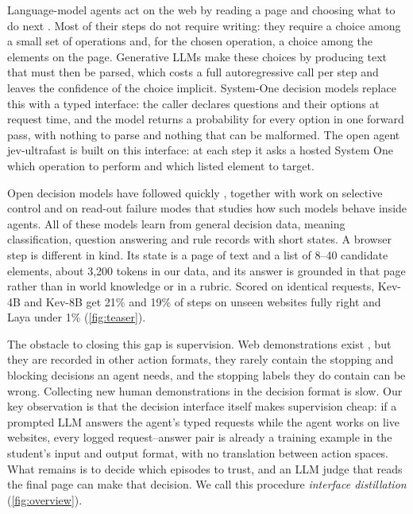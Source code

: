 \documentclass{article}
\begin{document}
Language-model agents act on the web by reading a page and choosing what to do next
\citep{yao2023react,zhou2024webarena,deng2023mind2web,he2024webvoyager}. Most of their steps do not require writing:
they require a choice among a small set of operations and, for the chosen operation, a choice among the elements on
the page. Generative LLMs make these choices by producing text that must then be parsed, which costs a full
autoregressive call per step and leaves the confidence of the choice implicit. System-One decision models
\citep{typesafe2026jev} replace this with a typed interface: the caller declares questions and their options at request
time, and the model returns a probability for every option in one forward pass, with nothing to parse and nothing that
can be malformed. The open agent jev-ultrafast \citep{jevultrafast2026} is built on this interface: at each step it asks
a hosted System One which operation to perform and which listed element to target.

Open decision models have followed quickly \citep{kev2026,laya2026,cheng2026thisthat}, together with work on
selective control \citep{wu2026reflex} and on read-out failure modes \citep{sun2026typesafe} that studies how such
models behave inside agents. All of these models learn from
general decision data, meaning classification, question answering and rule records with short states. A browser step
is different in kind. Its state is a page of text and a list of 8--40 candidate elements, about 3{,}200 tokens in our
data, and its answer is grounded in that page rather than in world knowledge or in a rubric. Scored on identical
requests, Kev-4B and Kev-8B get 21\% and 19\% of steps on unseen websites fully right and Laya under 1\%
(\cref{fig:teaser}).

The obstacle to closing this gap is supervision. Web demonstrations exist \citep{deng2023mind2web,murty2024nnetnav,lu2024weblinx},
but they are recorded in other action formats, they rarely contain the stopping and blocking decisions an agent needs,
and the stopping labels they do contain can be wrong. Collecting new human demonstrations in the decision format is
slow. Our key observation is that the decision interface itself makes supervision cheap: if a prompted LLM answers the
agent's typed requests while the agent works on live websites, every logged request--answer pair is already a training
example in the student's input and output format, with no translation between action spaces. What remains is to decide
which episodes to trust, and an LLM judge \citep{zheng2023judging} that reads the final page can make that decision.
We call this procedure \emph{interface distillation} (\cref{fig:overview}).
\end{document}
